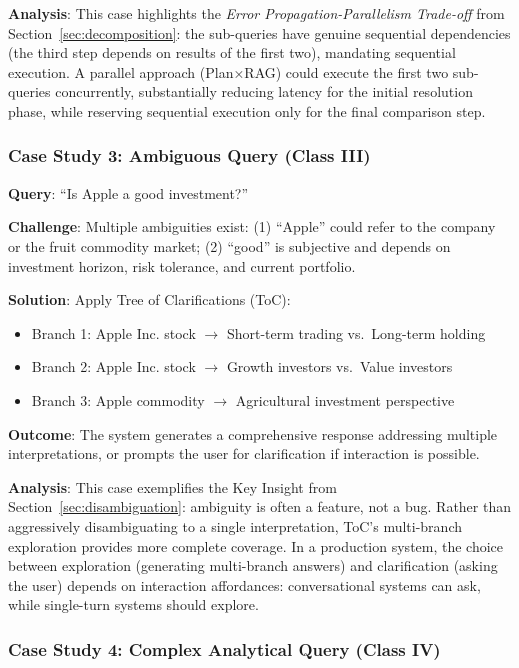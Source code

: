 \documentclass{article}
\begin{document}
\textbf{Analysis}: This case highlights the \textit{Error Propagation-Parallelism Trade-off} from Section~\ref{sec:decomposition}: the sub-queries have genuine sequential dependencies (the third step depends on results of the first two), mandating sequential execution. A parallel approach (Plan×RAG) could execute the first two sub-queries concurrently, substantially reducing latency for the initial resolution phase, while reserving sequential execution only for the final comparison step.

\subsubsection{Case Study 3: Ambiguous Query (Class III)}

\textbf{Query}: ``Is Apple a good investment?''

\textbf{Challenge}: Multiple ambiguities exist: (1) ``Apple'' could refer to the company or the fruit commodity market; (2) ``good'' is subjective and depends on investment horizon, risk tolerance, and current portfolio.

\textbf{Solution}: Apply Tree of Clarifications (ToC):
\begin{itemize}[leftmargin=*,nosep]
    \item Branch 1: Apple Inc. stock $\rightarrow$ Short-term trading vs.\ Long-term holding
    \item Branch 2: Apple Inc. stock $\rightarrow$ Growth investors vs.\ Value investors
    \item Branch 3: Apple commodity $\rightarrow$ Agricultural investment perspective
\end{itemize}

\textbf{Outcome}: The system generates a comprehensive response addressing multiple interpretations, or prompts the user for clarification if interaction is possible.

\textbf{Analysis}: This case exemplifies the Key Insight from Section~\ref{sec:disambiguation}: ambiguity is often a feature, not a bug. Rather than aggressively disambiguating to a single interpretation, ToC's multi-branch exploration provides more complete coverage. In a production system, the choice between exploration (generating multi-branch answers) and clarification (asking the user) depends on interaction affordances: conversational systems can ask, while single-turn systems should explore.

\subsubsection{Case Study 4: Complex Analytical Query (Class IV)}
\end{document}
